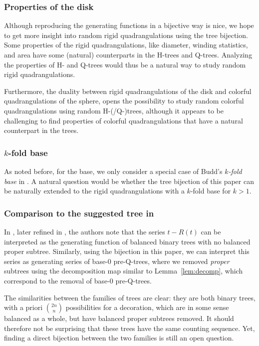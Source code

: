 \documentclass[11pt]{article}
\theoremstyle{plain}
\theoremstyle{definition}
\begin{document}
\subsubsection*{Properties of the disk}
Although reproducing the generating functions in a bijective way is nice, we hope to get more insight into random rigid quadrangulations using the tree bijection. 
Some properties of the rigid quadrangulations, like diameter, winding statistics, and area have some (natural) counterparts in the H-trees and Q-trees.
Analyzing the properties of H- and Q-trees would thus be a natural way to study random rigid quadrangulations.

Furthermore, the duality between rigid quadrangulations of the disk and colorful quadrangulations of the sphere, opens the possibility to study random colorful quadrangulations using random \mbox{H-(/Q-)trees,} although it appears to be challenging to find properties of colorful quadrangulations that have a natural counterpart in the trees.

\subsubsection*{\texorpdfstring{$k$}{k}-fold base}
As noted before, for the base, we only consider a special case of Budd's \emph{$k$-fold base} in \cite{Budd_rectilinear_2025}. 
A natural question would be whether the tree bijection of this paper can be naturally extended to the rigid quadrangulations with a $k$-fold base for $k>1$.

\subsubsection*{Comparison to the suggested tree in \cite{Bousquet-Melou_generating_2020,Bousquetmelou2025refinedenumerationplanareulerian}}

In \cite{Bousquet-Melou_generating_2020}, later refined in \cite{Bousquetmelou2025refinedenumerationplanareulerian}, the authors note that the series $t-R(t)$ can be interpreted as the generating function of balanced binary trees with no balanced proper subtree.
Similarly, using the bijection in this paper, we can interpret this series as generating series of base-$0$ pre-Q-trees, where we removed \emph{proper} subtrees using the decomposition map similar to Lemma~\ref{lem:decomp}, which correspond to the removal of base-$0$ pre-Q-trees.

The similarities between the families of trees are clear: they are both binary trees, with a priori $\binom{2n}{n}$ possibilities for a decoration, which are in some sense balanced as a whole, but have balanced proper subtrees removed. 
It should therefore not be surprising that these trees have the same counting sequence.
Yet, finding a direct bijection between the two families is still an open question.
\end{document}
